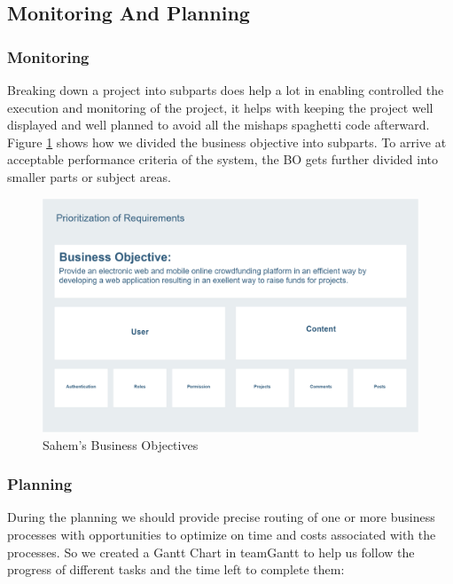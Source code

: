 \subsection{Monitoring And Planning}
\subsubsection*{Monitoring}
Breaking down a project into subparts does help a lot in enabling controlled the execution and monitoring of the project, it helps with keeping the project well displayed and well planned to avoid all the mishaps spaghetti code afterward.\\
Figure \ref{fig:bos} shows how we divided the business objective into subparts. To arrive at acceptable performance criteria of the system, the BO gets further divided into smaller parts or subject areas.
\begin{figure}[!ht]
      \center
      \includegraphics[scale=0.18]{assets/bos.png}
      \caption{Sahem's Business Objectives}
      \label{fig:bos}
\end{figure}
\subsubsection*{Planning}
During the planning we should provide precise routing of one or more business processes with opportunities to optimize on time and costs associated with the processes.
So we created a Gantt Chart in teamGantt to help us follow the progress of different tasks and the time left to complete them:

